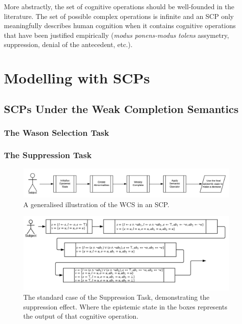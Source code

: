 \documentclass{article}
\begin{document}
More abstractly, the set of cognitive operations should be well-founded in the literature. The set of possible complex operations is infinite and an SCP only meaningfully describes human cognition when it contains cognitive operations that have been justified empirically (\textit{modus ponens-modus tolens} assymetry, suppression, denial of the antecedent, etc.). 

\section{Modelling with SCPs}
\subsection{SCPs Under the Weak Completion Semantics}
\subsubsection{The Wason Selection Task}

\subsubsection{The Suppression Task}
\begin{figure}
\begin{center}
 \centering \includegraphics[scale=0.65]{suppressionSCP_overview}
\caption{A generalised illustration of the WCS in an SCP. }
\label {fig:supoverview}
\end{center}
\end{figure}

\begin{figure}
\begin{center}
 \centering \includegraphics[scale=0.75]{suppressionSCP_normal}
\caption{The standard case of the Suppression Task, demonstrating the suppression effect. Where the epistemic state in the boxes represents the output of that cognitive operation.}
\label {fig:supnormal}
\end{center}
\end{figure}
\end{document}
